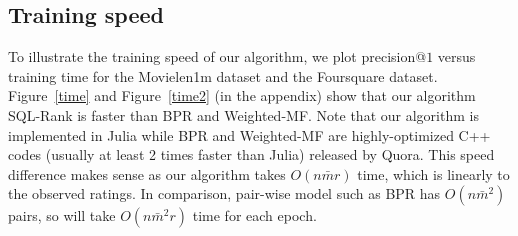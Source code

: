 \documentclass{article}
\begin{document}


\subsection{Training speed}

To illustrate the training speed of our algorithm, we plot precision@$1$ versus training time for the Movielen1m dataset and the Foursquare dataset. Figure~\ref{time} and Figure~\ref{time2} (in the appendix) show that our algorithm SQL-Rank is faster than BPR and Weighted-MF. Note that our algorithm is implemented in Julia while BPR and Weighted-MF are highly-optimized C++ codes (usually at least 2 times faster than Julia) released by Quora.  
This speed difference makes sense as our algorithm takes $O(n \bar{m} r)$ time, which is linearly to the observed ratings. In comparison, pair-wise model such as BPR
has $O(n\bar{m}^2)$ pairs, so will take $O(n \bar{m}^2 r)$ time for each epoch. 
\end{document}
